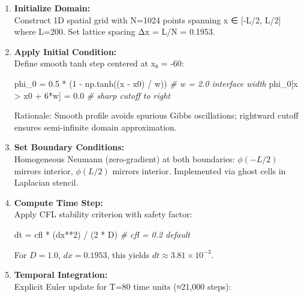 \documentclass[
]{article}
\newenvironment{Shaded}{}{}
\newcommand{\CommentTok}[1]{\textcolor[rgb]{0.38,0.63,0.69}{\textit{#1}}}
\newcommand{\DecValTok}[1]{\textcolor[rgb]{0.25,0.63,0.44}{#1}}
\newcommand{\FloatTok}[1]{\textcolor[rgb]{0.25,0.63,0.44}{#1}}
\newcommand{\NormalTok}[1]{#1}
\newcommand{\OperatorTok}[1]{\textcolor[rgb]{0.40,0.40,0.40}{#1}}
\begin{document}
\begin{enumerate}
\def\labelenumi{\arabic{enumi}.}
\item
  \textbf{Initialize Domain:}\\
  Construct 1D spatial grid with N=1024 points spanning x ∈ {[}-L/2,
  L/2{]} where L=200. Set lattice spacing Δx = L/N = 0.1953.
\item
  \textbf{Apply Initial Condition:}\\
  Define smooth tanh step centered at x₀ = -60:

\begin{Shaded}
\begin{Highlighting}[]
\NormalTok{phi\_0 }\OperatorTok{=} \FloatTok{0.5} \OperatorTok{*}\NormalTok{ (}\DecValTok{1} \OperatorTok{{-}}\NormalTok{ np.tanh((x }\OperatorTok{{-}}\NormalTok{ x0) }\OperatorTok{/}\NormalTok{ w))  }\CommentTok{\# w = 2.0 interface width}
\NormalTok{phi\_0[x }\OperatorTok{\textgreater{}}\NormalTok{ x0 }\OperatorTok{+} \DecValTok{6}\OperatorTok{*}\NormalTok{w] }\OperatorTok{=} \FloatTok{0.0}  \CommentTok{\# sharp cutoff to right}
\end{Highlighting}
\end{Shaded}

  Rationale: Smooth profile avoids spurious Gibbs oscillations;
  rightward cutoff ensures semi-infinite domain approximation.
\item
  \textbf{Set Boundary Conditions:}\\
  Homogeneous Neumann (zero-gradient) at both boundaries: \(\phi(-L/2)\)
  mirrors interior, \(\phi(L/2)\) mirrors interior. Implemented via
  ghost cells in Laplacian stencil.
\item
  \textbf{Compute Time Step:}\\
  Apply CFL stability criterion with safety factor:

\begin{Shaded}
\begin{Highlighting}[]
\NormalTok{dt }\OperatorTok{=}\NormalTok{ cfl }\OperatorTok{*}\NormalTok{ (dx}\OperatorTok{**}\DecValTok{2}\NormalTok{) }\OperatorTok{/}\NormalTok{ (}\DecValTok{2} \OperatorTok{*}\NormalTok{ D)  }\CommentTok{\# cfl = 0.2 default}
\end{Highlighting}
\end{Shaded}

  For \(D=1.0\), \(dx=0.1953\), this yields
  \(dt \approx 3.81\times 10^{-3}\).
\item
  \textbf{Temporal Integration:}\\
  Explicit Euler update for T=80 time units (≈21,000 steps):


\end{enumerate}
\end{document}
